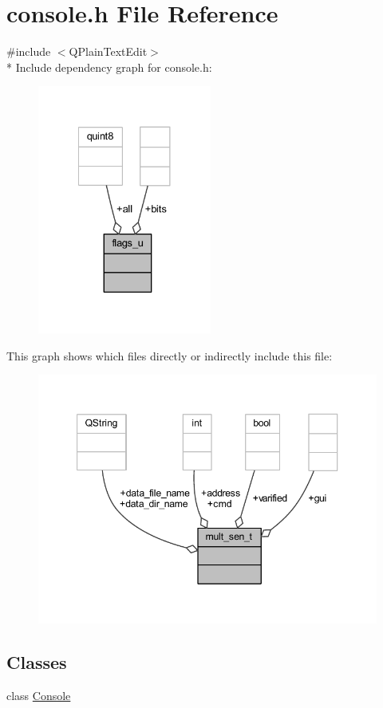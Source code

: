 \hypertarget{a00088}{\section{console.\+h File Reference}
\label{a00088}
}
{\ttfamily \#include $<$Q\+Plain\+Text\+Edit$>$}\\*
Include dependency graph for console.\+h\+:
\nopagebreak
\begin{figure}[H]
\begin{center}
\leavevmode
\includegraphics[width=162pt]{d6/d08/a00244}
\end{center}
\end{figure}
This graph shows which files directly or indirectly include this file\+:
\nopagebreak
\begin{figure}[H]
\begin{center}
\leavevmode
\includegraphics[width=350pt]{d6/d22/a00245}
\end{center}
\end{figure}
\subsection*{Classes}
\begin{DoxyCompactItemize}
\item 
class \hyperlink{a00005}{Console}
\end{DoxyCompactItemize}
